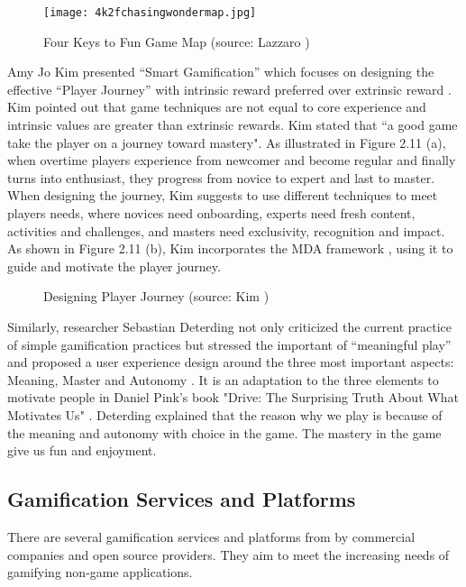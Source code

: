 \begin{figure}[htbp]
	\centering
		\texttt{[image: 4k2fchasingwondermap.jpg]}
		\caption{Four Keys to Fun Game Map (source: Lazzaro \cite{Lazzaro2011})}
		\label{fig:four-keys-to-fun}
\end{figure}

Amy Jo Kim presented ``Smart Gamification'' which focuses on designing the effective ``Player Journey'' with intrinsic reward preferred over extrinsic reward \cite {Kim2010}. Kim pointed out that game techniques are not equal to core experience and intrinsic values are greater than extrinsic rewards. Kim stated that ``a good game take the player on a journey toward mastery". As illustrated in Figure 2.11 (a), when overtime players experience from newcomer and become regular and finally turns into enthusiast, they progress from novice to expert and last to master. When designing the journey, Kim suggests to use different techniques to meet players needs, where novices need onboarding, experts need fresh content, activities and challenges, and masters need exclusivity, recognition and impact. As shown in Figure 2.11 (b), Kim incorporates the MDA framework \cite {hunicke2004mda}, using it to guide and motivate the player journey.

\begin{figure}[htbp]
	\centering
		\caption{Designing Player Journey (source: Kim \cite {Kim2010})}
		\label{fig:design-player-journey}
\end{figure}

Similarly, researcher Sebastian Deterding not only criticized the current practice of simple gamification practices but stressed the important of ``meaningful play'' and proposed a user experience design around the three most important aspects: Meaning, Master and Autonomy \cite {Deterding2011meaningful}. It is an adaptation to the three elements to motivate people in Daniel Pink's book "Drive: The Surprising Truth About What Motivates Us" \cite {pink2009drive}. Deterding explained that the reason why we play is because of the meaning and autonomy with choice in the game. The mastery in the game give us fun and enjoyment.

\subsection{Gamification Services and Platforms}
There are several gamification services and platforms from by commercial companies and open source providers. They aim to meet the increasing needs of gamifying non-game applications.

